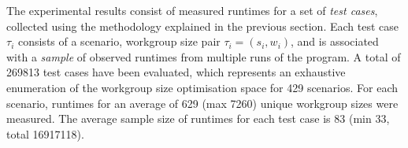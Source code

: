 \documentclass[nonatbib,preprint,9pt]{sigplanconf}
\begin{document}


The experimental results consist of measured runtimes for a set of
\emph{test cases}, collected using the methodology explained in the
previous section. Each test case $\tau_i$ consists of a scenario,
workgroup size pair $\tau_i = (s_i,w_i)$, and is associated with a
\emph{sample} of observed runtimes from multiple runs of the
program. A total of 269813 test cases have been evaluated, which
represents an exhaustive enumeration of the workgroup size
optimisation space for 429 scenarios. For each scenario, runtimes for
an average of 629 (max 7260) unique workgroup sizes were measured. The
average sample size of runtimes for each test case is 83 (min 33,
total 16917118).


\end{document}
